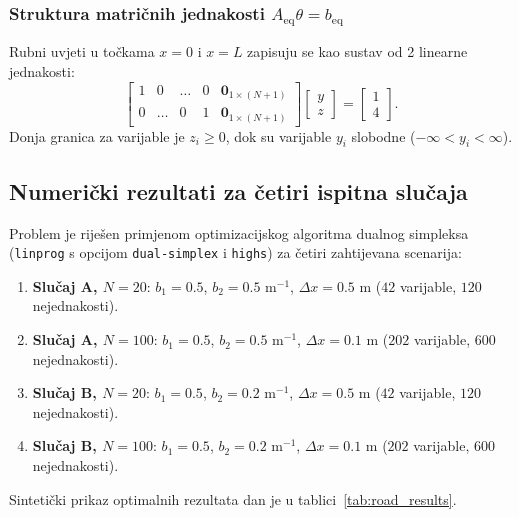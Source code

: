 \subsubsection{Struktura matričnih jednakosti $A_{\mathrm{eq}} \theta = b_{\mathrm{eq}}$}

Rubni uvjeti u točkama $x=0$ i $x=L$ zapisuju se kao sustav od 2 linearne jednakosti:
\begin{equation}
\begin{bmatrix}
1 & 0 & \dots & 0 & \mathbf{0}_{1 \times (N+1)} \\
0 & \dots & 0 & 1 & \mathbf{0}_{1 \times (N+1)}
\end{bmatrix} \begin{bmatrix} y \\ z \end{bmatrix} = \begin{bmatrix} 1 \\ 4 \end{bmatrix}.
\end{equation}
Donja granica za varijable je $z_i \geq 0$, dok su varijable $y_i$ slobodne ($-\infty < y_i < \infty$).

\subsection{Numerički rezultati za četiri ispitna slučaja}

Problem je riješen primjenom optimizacijskog algoritma dualnog simpleksa (\texttt{linprog} s opcijom \texttt{dual-simplex} i \texttt{highs}) za četiri zahtijevana scenarija:
\begin{enumerate}
    \item \textbf{Slučaj A, $N=20$}: $b_1 = 0.5$, $b_2 = 0.5 \text{ m}^{-1}$, $\Delta x = 0.5 \text{ m}$ ($42$ varijable, $120$ nejednakosti).
    \item \textbf{Slučaj A, $N=100$}: $b_1 = 0.5$, $b_2 = 0.5 \text{ m}^{-1}$, $\Delta x = 0.1 \text{ m}$ ($202$ varijable, $600$ nejednakosti).
    \item \textbf{Slučaj B, $N=20$}: $b_1 = 0.5$, $b_2 = 0.2 \text{ m}^{-1}$, $\Delta x = 0.5 \text{ m}$ ($42$ varijable, $120$ nejednakosti).
    \item \textbf{Slučaj B, $N=100$}: $b_1 = 0.5$, $b_2 = 0.2 \text{ m}^{-1}$, $\Delta x = 0.1 \text{ m}$ ($202$ varijable, $600$ nejednakosti).
\end{enumerate}

Sintetički prikaz optimalnih rezultata dan je u tablici~\ref{tab:road_results}.

